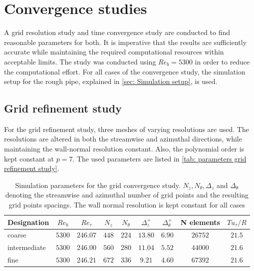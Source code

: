 \section{Convergence studies} \label{sec: convergence studies}
A grid resolution study and time convergence study are conducted to find reasonable parameters for both.
It is imperative that the results are sufficiently accurate while maintaining the required computational resources within acceptable limits.
The study was conducted using $Re_b = 5300$ in order to reduce the computational effort.
For all cases of the convergence study, the simulation setup for the rough pipe, explained in \autoref{sec: Simulation setup}, is used.

\subsection{Grid refinement study}\label{subsec: grid refinement study}
For the grid refinement study, three meshes of varying resolutions are used.
The resolutions are altered in both the streamwise and azimuthal directions, while maintaining the wall-normal resolution constant.
Also, the polynomial order is kept constant at $p = 7$.
The used parameters are listed in \autoref{tab: parameters grid refinement study}.
\begin{table}
\centering
\caption[Simulation parameters for the grid convergence study]{Simulation parameters for the grid convergence study. $N_z, N_\theta, \Delta_z$ and $\Delta_\theta$ denoting the streamwise and azimuthal number of grid points and the resulting grid points spacings. The wall normal resolution is kept constant for all cases}
\begin{tabular}{l c c c c c c c c } 
\toprule
Designation     & $Re_b$    & $Re_\tau$     & $N_z$     & $N_{\theta}$  & $\Delta^+_z$    & $\Delta^+_\theta$   & N elements & $Tu_\tau / R$\\
\midrule
coarse          & $5300$     & $246.07$      & $448$     & $224$         & $13.80$       & $6.90$            & $26752$    & $21.5$\\
intermediate    & $5300$     & $246.00$      & $560$     & $280$         & $11.04$       & $5.52$            & $44000$    & $21.6$\\
fine            & $5300$     & $246.21$      & $672$     & $336$         & $9.21$        & $4.60$            & $67392$    & $21.6$\\
\bottomrule
\end{tabular}
\label{tab: parameters grid refinement study}
\end{table}
